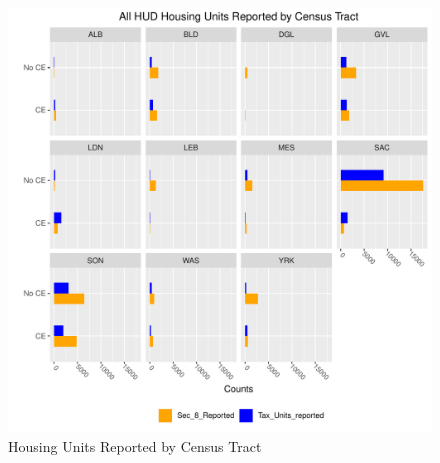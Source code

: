 \documentclass{article}\usepackage[]{graphicx}\usepackage[]{color}
\makeatletter
\def\maxwidth{ %
  \ifdim\Gin@nat@width>\linewidth
    \linewidth
  \else
    \Gin@nat@width
  \fi
}
\newenvironment{knitrout}{}{} %
\makeatother
\begin{document}
\begin{knitrout}
\color{fgcolor}\begin{figure}
\includegraphics[width=\maxwidth]{figure/MultiPlot_All_Units_Counts_dodge-1} \caption[Housing Units Reported by Census Tract]{Housing Units Reported by Census Tract}\label{fig:MultiPlot_All_Units_Counts_dodge}
\end{figure}


\end{knitrout}

\newpage

\FloatBarrier
\end{document}
